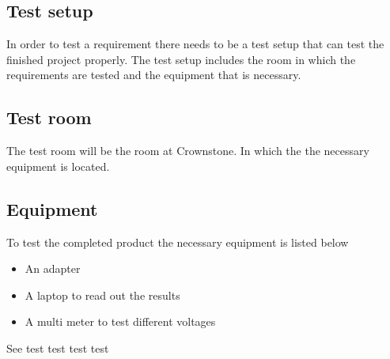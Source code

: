 \subsection{Test setup}
\label{sec:Test_setup}
In order to test a requirement there needs to be a test setup that can test the finished project properly. The test setup includes the room in which the requirements are tested and the equipment that is necessary.

\subsection{Test room}
The test room will be the room at Crownstone. In which the the necessary equipment is located.

\subsection{Equipment}

To test the completed product the necessary equipment is listed below

\begin{itemize}
    \item An adapter
    \item A laptop to read out the results
    \item A multi meter to test different voltages
\end{itemize}

{See }
{test}
{test}
{test}
{test}